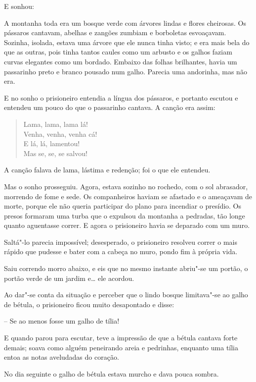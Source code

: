 E sonhou:

A montanha toda era um bosque verde com árvores lindas e flores
cheirosas. Os pássaros cantavam, abelhas e zangões zumbiam e borboletas
esvoaçavam. Sozinha, isolada, estava uma árvore que ele nunca tinha
visto; e era mais bela do que as outras, pois tinha tantos caules como
um arbusto e os galhos faziam curvas elegantes como um bordado. Embaixo
das folhas brilhantes, havia um passarinho preto e branco pousado num
galho. Parecia uma andorinha, mas não era.

E no sonho o prisioneiro entendia a língua dos pássaros, e portanto
escutou e entendeu um pouco do que o passarinho cantava. A canção era
assim: 
\begin{verse}
Lama, lama, lama lá!\\ 
Venha, venha, venha cá!\\ 
E lá, lá, lamentou!\\ 
Mas se, se, se salvou!\\
\end{verse}

A canção falava de lama, lástima e redenção; foi o que ele entendeu.

Mas o sonho prosseguiu. Agora, estava sozinho no rochedo, com o sol
abrasador, morrendo de fome e sede. Os companheiros haviam se afastado
e o ameaçavam de morte, porque ele não queria participar do plano para
incendiar o presídio. Os presos formaram uma turba que o expulsou da
montanha a pedradas, tão longe quanto aguentasse correr. E agora o
prisioneiro havia se deparado com um muro.

Saltá"-lo parecia impossível; desesperado, o prisioneiro resolveu
correr o mais rápido que pudesse e bater com a cabeça no muro, pondo
fim à própria vida.

Saiu correndo morro abaixo, e eis que no mesmo instante abriu"-se um
portão, o portão verde de um jardim e\ldots{} ele acordou.

Ao dar"-se conta da situação e perceber que o lindo bosque
limitava"-se ao galho de bétula, o prisioneiro ficou muito desapontado
e disse:

-- Se ao menos fosse um galho de tília!

E quando parou para escutar, teve a impressão de que a bétula cantava
forte demais; soava como alguém peneirando areia e pedrinhas, enquanto
uma tília entoa as notas aveludadas do coração.

No dia seguinte o galho de bétula estava murcho e dava pouca sombra.

